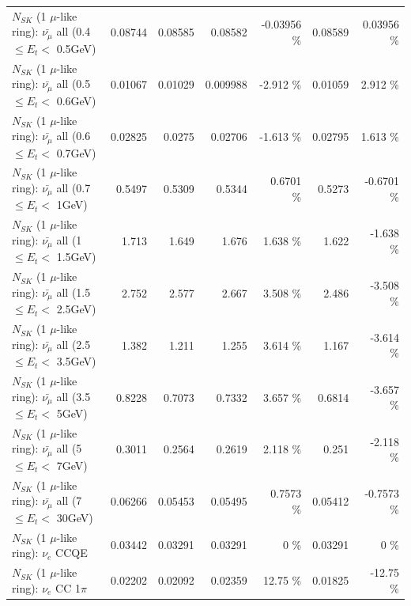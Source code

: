 \begin{table}
\begin{tabular}{| l | r | r | r  r | r  r |}
 $N_{SK}$ (1 $\mu$-like ring): $\bar{\nu_{\mu}}$ all (0.4 $\leq E_{t} <$ 0.5GeV) &         0.08744 &         0.08585 &         0.08582 & -0.03956 \%  &         0.08589 &  0.03956 \%  \\ 
 $N_{SK}$ (1 $\mu$-like ring): $\bar{\nu_{\mu}}$ all (0.5 $\leq E_{t} <$ 0.6GeV) &         0.01067 &         0.01029 &        0.009988 &   -2.912 \%  &         0.01059 &    2.912 \%  \\ 
 $N_{SK}$ (1 $\mu$-like ring): $\bar{\nu_{\mu}}$ all (0.6 $\leq E_{t} <$ 0.7GeV) &         0.02825 &          0.0275 &         0.02706 &   -1.613 \%  &         0.02795 &    1.613 \%  \\ 
   $N_{SK}$ (1 $\mu$-like ring): $\bar{\nu_{\mu}}$ all (0.7 $\leq E_{t} <$ 1GeV) &          0.5497 &          0.5309 &          0.5344 &   0.6701 \%  &          0.5273 &  -0.6701 \%  \\ 
   $N_{SK}$ (1 $\mu$-like ring): $\bar{\nu_{\mu}}$ all (1 $\leq E_{t} <$ 1.5GeV) &           1.713 &           1.649 &           1.676 &    1.638 \%  &           1.622 &   -1.638 \%  \\ 
 $N_{SK}$ (1 $\mu$-like ring): $\bar{\nu_{\mu}}$ all (1.5 $\leq E_{t} <$ 2.5GeV) &           2.752 &           2.577 &           2.667 &    3.508 \%  &           2.486 &   -3.508 \%  \\ 
 $N_{SK}$ (1 $\mu$-like ring): $\bar{\nu_{\mu}}$ all (2.5 $\leq E_{t} <$ 3.5GeV) &           1.382 &           1.211 &           1.255 &    3.614 \%  &           1.167 &   -3.614 \%  \\ 
   $N_{SK}$ (1 $\mu$-like ring): $\bar{\nu_{\mu}}$ all (3.5 $\leq E_{t} <$ 5GeV) &          0.8228 &          0.7073 &          0.7332 &    3.657 \%  &          0.6814 &   -3.657 \%  \\ 
     $N_{SK}$ (1 $\mu$-like ring): $\bar{\nu_{\mu}}$ all (5 $\leq E_{t} <$ 7GeV) &          0.3011 &          0.2564 &          0.2619 &    2.118 \%  &           0.251 &   -2.118 \%  \\ 
    $N_{SK}$ (1 $\mu$-like ring): $\bar{\nu_{\mu}}$ all (7 $\leq E_{t} <$ 30GeV) &         0.06266 &         0.05453 &         0.05495 &   0.7573 \%  &         0.05412 &  -0.7573 \%  \\ 
\hline
\hline
\hline
                                      $N_{SK}$ (1 $\mu$-like ring): $\nu_e$ CCQE &         0.03442 &         0.03291 &         0.03291 &        0 \%  &         0.03291 &        0 \%  \\ 
                                 $N_{SK}$ (1 $\mu$-like ring): $\nu_e$ CC 1$\pi$ &         0.02202 &         0.02092 &         0.02359 &    12.75 \%  &         0.01825 &   -12.75 \%  \\ 

\end{tabular}
\end{table}
